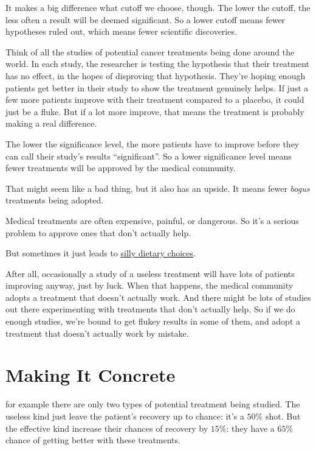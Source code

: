 \documentclass[justified]{tufte-book}
\theoremstyle{definition}
\theoremstyle{definition}
\theoremstyle{definition}
\theoremstyle{remark}
\begin{document}
It makes a big difference what cutoff we choose, though. The lower the cutoff, the less often a result will be deemed significant. So a lower cutoff means fewer hypotheses ruled out, which means fewer scientific discoveries.

Think of all the studies of potential cancer treatments being done around the world. In each study, the researcher is testing the hypothesis that their treatment has no effect, in the hopes of disproving that hypothesis. They're hoping enough patients get better in their study to show the treatment genuinely helps. If just a few more patients improve with their treatment compared to a placebo, it could just be a fluke. But if a lot more improve, that means the treatment is probably making a real difference.

The lower the significance level, the more patients have to improve before they can call their study's results ``significant''. So a lower significance level means fewer treatments will be approved by the medical community.

That might seem like a bad thing, but it also has an upside. It means fewer \emph{bogus} treatments being adopted.

\begin{marginfigure}
Medical treatments are often expensive, painful, or dangerous. So it's a
serious problem to approve ones that don't actually help.

But sometimes it just leads to \href{https://xkcd.com/882/}{silly
dietary choices}.
\end{marginfigure}

After all, occasionally a study of a useless treatment will have lots of patients improving anyway, just by luck. When that happens, the medical community adopts a treatment that doesn't actually work. And there might be lots of studies out there experimenting with treatments that don't actually help. So if we do enough studies, we're bound to get flukey results in some of them, and adopt a treatment that doesn't actually work by mistake.

\hypertarget{making-it-concrete}{%
\section{Making It Concrete}\label{making-it-concrete}}

 for example there are only two types of potential treatment being studied. The useless kind just leave the patient's recovery up to chance: it's a \(50\%\) shot. But the effective kind increase their chances of recovery by \(15\%\): they have a \(65\%\) chance of getting better with these treatments.
\end{document}
